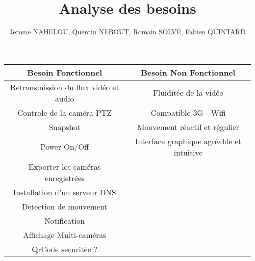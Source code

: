 \documentclass[a4paper,10pt]{report}
\begin{document}
\title{Analyse des besoins}
\author{Jerome NAHELOU, Quentin NEBOUT, Romain SOLVE, Fabien QUINTARD}


 \begin{center}
   \begin{tabular}{|c|c}
    \hline
   Besoin Fonctionnel & Besoin Non Fonctionnel \\
    \hline
    Retransmission du flux vidéo et audio & Fluiditée de la vidéo \\
    Controle de la caméra PTZ & Compatible 3G - Wifi\\
    Snapshot & Mouvement réactif et régulier\\
    Power On/Off & Interface graphique agréable et intuitive\\
    Exporter les caméras enregistrées & \\
    Installation d'un serveur DNS & \\
    Detection de mouvement & \\
    Notification & \\
    Affichage Multi-caméras & \\
    QrCode securitée ? & \\
    \hline
   \end{tabular}
  \end{center}
  
\end{document}
